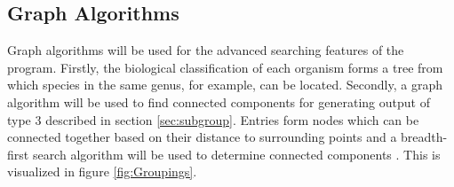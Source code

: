 \documentclass{article}
\begin{document}
\subsection{Graph Algorithms}\label{sec:graphalgs}
Graph algorithms will be used for the advanced searching features of the program. Firstly, the biological classification of each organism forms a tree from which species in the same genus, for example, can be located. Secondly, a graph algorithm will be used to find connected components for generating output of type 3 described in section \ref{sec:subgroup}. Entries form nodes which can be connected together based on their distance to surrounding points and a breadth-first search algorithm will be used to determine connected components \citep{broder2000graph}. This is visualized in figure \ref{fig:Groupings}.
\end{document}

